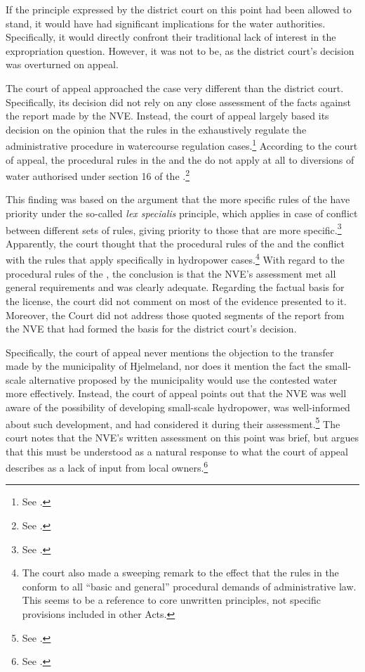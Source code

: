 If the principle expressed by the district court on this point had been allowed to stand, it would have had significant implications for the water authorities. Specifically, it would directly confront their traditional lack of interest in the expropriation question. However, it was not to be, as the district court's decision was overturned on appeal.

The court of appeal approached the case very different than the district court. Specifically, its decision did not rely on any close assessment of the facts against the report made by the NVE. Instead, the court of appeal largely based its decision on the opinion that the rules in the \cite{wra17} exhaustively regulate the administrative procedure in watercourse regulation cases.\footnote{See \cite[7]{jorpeland11a}.} According to the court of appeal, the procedural rules in the \cite{ea59} and the \cite{paa67} do not apply at all to diversions of water authorised under section 16 of the \cite{wra17}.\footnote{See \cite[7]{jorpeland11a}.} 

This finding was based on the argument that the more specific rules of the \cite{wra17} have priority under the so-called {\it lex specialis} principle, which applies in case of conflict between different sets of rules, giving priority to those that are more specific.\footnote{See \cite[7]{jorpeland11a}.} Apparently, the court thought that the procedural rules of the \cite{ea59} and the \cite{paa67} conflict with the rules that apply specifically in hydropower cases.\footnote{The court also made a sweeping remark to the effect that the rules in the \cite{wra17} conform to all ``basic and general'' procedural demands of administrative law. This seems to be a reference to core unwritten principles, not specific provisions included in other Acts.} With regard to the procedural rules of the \cite{wra17}, the conclusion is that the NVE's assessment met all general requirements and was clearly adequate. Regarding the factual basis for the license, the court did not comment on most of the evidence presented to it. Moreover, the Court did not address those quoted segments of the report from the NVE that had formed the basis for the district court's decision.

Specifically, the court of appeal never mentions the objection to the transfer made by the municipality of Hjelmeland, nor does it mention the fact the small-scale alternative proposed by the municipality would use the contested water more effectively. Instead, the court of appeal points out that the NVE was well aware of the possibility of developing small-scale hydropower, was well-informed about such development, and had considered it during their assessment.\footnote{See \cite[9]{jorpeland11a}.} The court notes that the NVE's written assessment on this point was brief, but argues that this must be understood as a natural response to what the court of appeal describes as a lack of input from local owners.\footnote{See \cite[9]{jorpeland11a}.}

